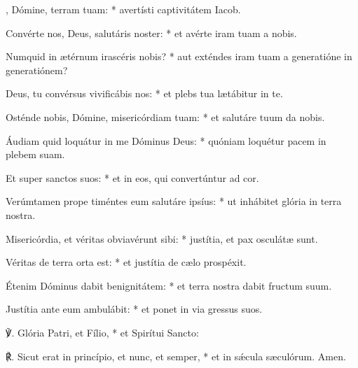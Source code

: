 {, Dómine, terram tuam: * avertísti captivitátem Iacob.\par
{}
Convérte nos, Deus, salutáris noster: * et avérte iram tuam a nobis.\par
Numquid in {\ae}térnum irascéris nobis? * aut exténdes iram tuam a generatióne in generatiónem?\par
Deus, tu convérsus vivificábis nos: * et plebs tua l{\ae}tábitur in te.\par
Osténde nobis, Dómine, misericórdiam tuam: * et salutáre tuum da nobis.\par
Áudiam quid loquátur in me Dóminus Deus: * quóniam loquétur pacem in plebem suam.\par
Et super sanctos suos: * et in eos, qui convertúntur ad cor.\par
Verúmtamen prope timéntes eum salutáre ipsíus: * ut inhábitet glória in terra nostra.\par
Misericórdia, et véritas obviavérunt sibi: * justítia, et pax osculát{\ae} sunt.\par
Véritas de terra orta est: * et justítia de c{\ae}lo prospéxit.\par
Étenim Dóminus dabit benignitátem: * et terra nostra dabit fructum suum.\par
Justítia ante eum ambulábit: * et ponet in via gressus suos.\par
℣. Glória Patri, et Fílio, * et Spirítui Sancto:\par
℟. Sicut erat in princípio, et nunc, et semper, * et in sǽcula s{\ae}culórum. Amen.}

